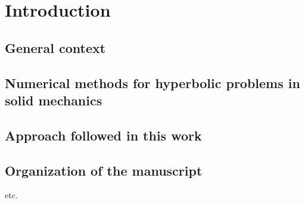 \chapter{Introduction}

\section{General context}



\section{Numerical methods for hyperbolic problems in solid mechanics}



\section{Approach followed in this work}


\section{Organization of the manuscript}
etc.











